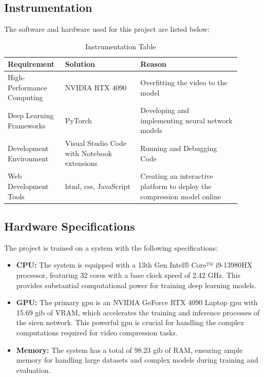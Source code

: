 \documentclass{ioereport}
\begin{document}
\subsection{Instrumentation}
    The software and hardware used for this project are listed below:
    \begin{table}[H]
        \caption{Instrumentation Table}
        \label{table:instrumentation-table}
        \centering
        \begin{tabular}{|L{0.2\linewidth}|L{0.3\linewidth}|L{0.4\linewidth}|}
            \hline
            \textbf{Requirement} & \textbf{Solution} & \textbf{Reason} \\
            \hline
            High-Performance Computing & NVIDIA RTX 4090 & Overfitting the video to the model \\
            \hline
            Deep Learning Frameworks & PyTorch &
            Developing and implementing neural network models \\
            \hline
            Development Environment & Visual Studio Code with Notebook extensions & Running and Debugging Code\\
            \hline
            Web Development Tools & \gls{html}, \gls{css}, JavaScript & Creating an interactive platform to deploy the compression model online \\
            \hline
        \end{tabular}
    \end{table}

\subsection{Hardware Specifications}
The project is trained on a system with the following specifications:
    \begin{itemize}
        \item \textbf{CPU:} The system is equipped with a 13th Gen Intel® Core™ i9-13980HX processor, featuring 32 cores with a base clock speed of 2.42 GHz. This provides substantial computational power for training deep learning models.
        \item \textbf{GPU:} The primary \gls{gpu} is an NVIDIA GeForce RTX 4090 Laptop \gls{gpu} with 15.69 \gls{gib} of VRAM, which accelerates the training and inference processes of the \gls{siren} network. This powerful \gls{gpu} is crucial for handling the complex computations required for video compression tasks.
        \item \textbf{Memory:} The system has a total of 98.23 \gls{gib} of RAM, ensuring ample memory for handling large datasets and complex models during training and evaluation.
    \end{itemize}
\end{document}
